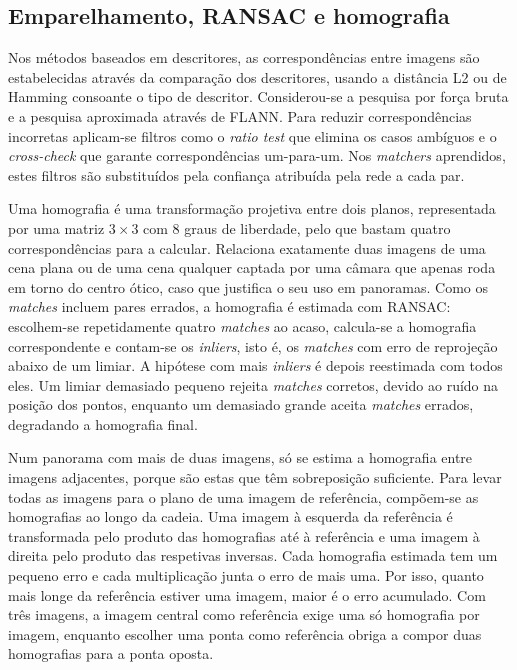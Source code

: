 \documentclass[11pt,a4paper]{article}
\begin{document}
\subsection{Emparelhamento, RANSAC e homografia} %
\label{sec:emparelhamento}

Nos métodos baseados em descritores, as correspondências entre imagens são estabelecidas através da comparação dos descritores, usando a distância L2 ou de Hamming consoante o tipo de descritor. Considerou-se a pesquisa por força bruta e a pesquisa aproximada através de FLANN. Para reduzir correspondências incorretas aplicam-se filtros como o \textit{ratio test} que elimina os casos ambíguos e o \textit{cross-check} que garante correspondências um-para-um. Nos \textit{matchers} aprendidos, estes filtros são substituídos pela confiança atribuída pela rede a cada par.

Uma homografia é uma transformação projetiva entre dois planos, representada por uma matriz $3\times3$ com 8 graus de liberdade, pelo que bastam quatro correspondências para a calcular. Relaciona exatamente duas imagens de uma cena plana ou de uma cena qualquer captada por uma câmara que apenas roda em torno do centro ótico, caso que justifica o seu uso em panoramas. Como os \textit{matches} incluem pares errados, a homografia é estimada com RANSAC: escolhem-se repetidamente quatro \textit{matches} ao acaso, calcula-se a homografia correspondente e contam-se os \textit{inliers}, isto é, os \textit{matches} com erro de reprojeção abaixo de um limiar. A hipótese com mais \textit{inliers} é depois reestimada com todos eles. Um limiar demasiado pequeno rejeita \textit{matches} corretos, devido ao ruído na posição dos pontos, enquanto um demasiado grande aceita \textit{matches} errados, degradando a homografia final.

Num panorama com mais de duas imagens, só se estima a homografia entre imagens adjacentes, porque são estas que têm sobreposição suficiente. Para levar todas as imagens para o plano de uma imagem de referência, compõem-se as homografias ao longo da cadeia. Uma imagem à esquerda da referência é transformada pelo produto das homografias até à referência e uma imagem à direita pelo produto das respetivas inversas. Cada homografia estimada tem um pequeno erro e cada multiplicação junta o erro de mais uma. Por isso, quanto mais longe da referência estiver uma imagem, maior é o erro acumulado. Com três imagens, a imagem central como referência exige uma só homografia por imagem, enquanto escolher uma ponta como referência obriga a compor duas homografias para a ponta oposta.
\end{document}
